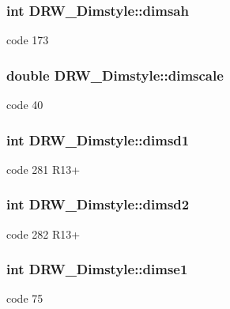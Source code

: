 \subsubsection[{dimsah}]{\setlength{\rightskip}{0pt plus 5cm}int D\+R\+W\+\_\+\+Dimstyle\+::dimsah}\label{class_d_r_w___dimstyle_aa0bbdb436f7fe738ee5566a2a447170d}
code 173 \hypertarget{class_d_r_w___dimstyle_a2b9d92349258970f08efd3bd25d8cfd2}{}
\subsubsection[{dimscale}]{\setlength{\rightskip}{0pt plus 5cm}double D\+R\+W\+\_\+\+Dimstyle\+::dimscale}\label{class_d_r_w___dimstyle_a2b9d92349258970f08efd3bd25d8cfd2}
code 40 \hypertarget{class_d_r_w___dimstyle_a67e56dca697de6cb0514ba2e95a0907f}{}
\subsubsection[{dimsd1}]{\setlength{\rightskip}{0pt plus 5cm}int D\+R\+W\+\_\+\+Dimstyle\+::dimsd1}\label{class_d_r_w___dimstyle_a67e56dca697de6cb0514ba2e95a0907f}
code 281 R13+ \hypertarget{class_d_r_w___dimstyle_adee8bad44d6c486361c2809c0eeca8d6}{}
\subsubsection[{dimsd2}]{\setlength{\rightskip}{0pt plus 5cm}int D\+R\+W\+\_\+\+Dimstyle\+::dimsd2}\label{class_d_r_w___dimstyle_adee8bad44d6c486361c2809c0eeca8d6}
code 282 R13+ \hypertarget{class_d_r_w___dimstyle_ab22248ba9479af5636e522d9bbaf098d}{}
\subsubsection[{dimse1}]{\setlength{\rightskip}{0pt plus 5cm}int D\+R\+W\+\_\+\+Dimstyle\+::dimse1}\label{class_d_r_w___dimstyle_ab22248ba9479af5636e522d9bbaf098d}
code 75 \hypertarget{class_d_r_w___dimstyle_a216852cf21ff08714ec7ce33085a7d76}{}
